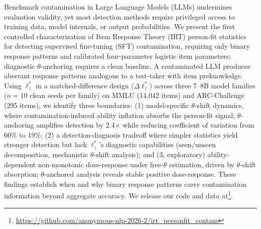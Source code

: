 Benchmark contamination in Large Language Models (LLMs) undermines evaluation validity, yet most detection methods require privileged access to training data, model internals, or output probabilities.
We present the first controlled characterization of Item Response Theory (IRT) person-fit statistics for detecting supervised fine-tuning (SFT) contamination, requiring only binary response patterns and calibrated four-parameter logistic item parameters; diagnostic $\theta$-anchoring requires a clean baseline.
A contaminated LLM produces aberrant response patterns analogous to a test-taker with item preknowledge.
Using $\ell_z^*$ in a matched-difference design ($\Delta\ell_z^*$) across three 7--8B model families ($n{=}10$ clean seeds per family) on MMLU (14,042 items) and ARC-Challenge (295 items), we identify three boundaries:
(1) model-specific $\theta$-shift dynamics, where contamination-induced ability inflation absorbs the person-fit signal; $\theta$-anchoring amplifies detection by 2.4$\times$ while reducing coefficient of variation from 60\% to 19\%;
(2) a detection-diagnosis tradeoff where simpler statistics yield stronger detection but lack $\ell_z^*$'s diagnostic capabilities (seen/unseen decomposition, mechanistic $\theta$-shift analysis);
and (3, exploratory) ability-dependent non-monotonic dose-response under free-$\theta$ estimation, driven by $\theta$-shift absorption; $\theta$-anchored analysis reveals stable positive dose-response.
These findings establish when and why binary response patterns carry contamination information beyond aggregate accuracy. We release our code and data at\footnote{\url{https://github.com/anonymous-nlp-2026-2/irt_personfit_contam}}.
